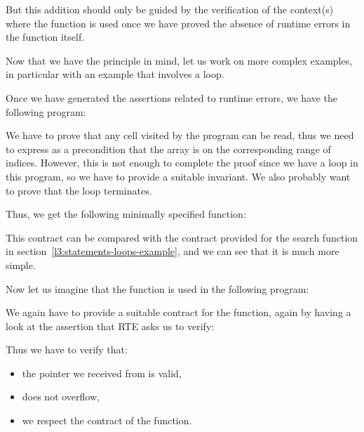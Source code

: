 

But this addition should only be guided by the verification of the context(s)
where the function is used once we have proved the absence of runtime errors in
the function itself.





Now that we have the principle in mind, let us work on more complex examples, in
particular with an example that involves a loop.




Once we have generated the assertions related to runtime errors, we have the
following program:




We have to prove that any cell visited by the program can be read, thus we need
to express as a precondition that the array is
 on the corresponding range of indices.
However, this is not enough to complete the proof since we have a loop in this
program, so we have to provide a suitable invariant. We also probably want to
prove that the loop terminates.


Thus, we get the following minimally specified function:




This contract can be compared with the contract provided for the search
function in section~\ref{l3:statements-loops-example}, and we can see that it is
much more simple.


Now let us imagine that the function is used in the following program:




We again have to provide a suitable contract for the function, again by having
a look at the assertion that RTE asks us to verify:




Thus we have to verify that:


\begin{itemize}
\item the pointer we received from  is valid,
\item {} does not overflow,
\item we respect the contract of the  function.
\end{itemize}


